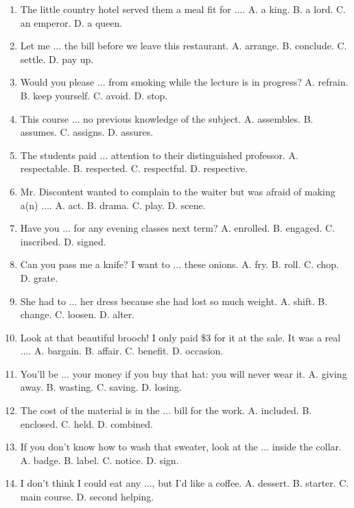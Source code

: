 \documentclass{article}
\numberwithin{equation}{section}
\begin{document}
\begin{enumerate}[leftmargin=8mm]
	\item The little country hotel served them a meal fit for $\ldots$. {\sf A.} a king. {\sf B.} a lord. {\sf C.} an emperor. {\sf D.} a queen.
	\item Let me $\ldots$ the bill before we leave this restaurant. {\sf A.} arrange. {\sf B.} conclude. {\sf C.} settle. {\sf D.} pay up.
	\item Would you please $\ldots$ from smoking while the lecture is in progress? {\sf A.} refrain. {\sf B.} keep yourself. {\sf C.} avoid. {\sf D.} stop.
	\item This course $\ldots$ no previous knowledge of the subject. {\sf A.} assembles. {\sf B.} assumes. {\sf C.} assigns. {\sf D.} assures.
	\item The students paid $\ldots$ attention to their distinguished professor. {\sf A.} respectable. {\sf B.} respected. {\sf C.} respectful. {\sf D.} respective.
	\item Mr. Discontent wanted to complain to the waiter but was afraid of making a(n) $\ldots$. {\sf A.} act. {\sf B.} drama. {\sf C.} play. {\sf D.} scene.
	\item Have you $\ldots$ for any evening classes next term? {\sf A.} enrolled. {\sf B.} engaged. {\sf C.} inscribed. {\sf D.} signed.
	\item Can you pass me a knife? I want to $\ldots$ these onions. {\sf A.} fry. {\sf B.} roll. {\sf C.} chop. {\sf D.} grate.
	\item She had to $\ldots$ her dress because she had lost so much weight. {\sf A.} shift. {\sf B.} change. {\sf C.} loosen. {\sf D.} alter.
	\item Look at that beautiful brooch! I only paid \$3 for it at the sale. It was a real $\ldots$. {\sf A.} bargain. {\sf B.} affair. {\sf C.} benefit. {\sf D.} occasion.
	\item You'll be $\ldots$ your money if you buy that hat: you will never wear it. {\sf A.} giving away. {\sf B.} wasting. {\sf C.} saving. {\sf D.} losing.
	\item The cost of the material is in the $\ldots$ bill for the work. {\sf A.} included. {\sf B.} enclosed. {\sf C.} held. {\sf D.} combined.
	\item If you don't know how to wash that sweater, look at the $\ldots$ inside the collar. {\sf A.} badge. {\sf B.} label. {\sf C.} notice. {\sf D.} sign.
	\item I don't think I could eat any $\ldots$, but I'd like a coffee. {\sf A.} dessert. {\sf B.} starter. {\sf C.} main course. {\sf D.} second helping.

\end{enumerate}
\end{document}

